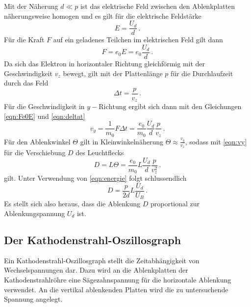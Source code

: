 Mit der Näherung $d \ll p$ ist das elektrische Feld zwischen den Ablenkplatten näherungsweise
homogen und es gilt für die elektrische Feldstärke
\begin{equation}
  E = \frac{U_d}{d}\,.
  \label{eqn:EUd}
\end{equation}
Für die Kraft $F$ auf ein geladenes Teilchen im elektrischen Feld gilt dann
\begin{equation}
  F = e_0 E = e_0 \frac{U_d}{d}\,.
  \label{eqn:Fe0E}
\end{equation}
Da sich das Elektron in horizontaler Richtung gleichförmig mit der Geschwindigkeit
$v_z$ bewegt, gilt mit der Plattenlänge $p$ für die Durchlaufzeit durch das Feld
\begin{equation}
  \Delta t = \frac{p}{v_z}\,.
  \label{eqn:deltat}
\end{equation}
Für die Geschwindigkeit in $y-\text{Richtung}$ ergibt sich dann mit den Gleichungen
\eqref{eqn:Fe0E} und \eqref{eqn:deltat}
\begin{equation}
  v_y = \frac{1}{m_0} F \Delta t = \frac{e_0}{m_0}\frac{U_d}{d}\frac{p}{v_z}\,.
  \label{eqn:vy}
\end{equation}
Für den Ablenkwinkel $\Theta$ gilt in Kleinwinkelnäherung $\Theta \approx \frac{v_y}{v_z}$, sodass
mit \eqref{eqn:vy} für die Verschiebung $D$ des Leuchtflecks
\begin{equation}
  D = L \Theta = \frac{e_0}{m_0} L \frac{U_d}{d}\frac{p}{v_z^2}\,.
\end{equation}
gilt. Unter Verwendung von \eqref{eqn:energie} folgt schlussendlich
\begin{equation}
  D = \frac{p}{2d} L \frac{U_d}{U_B}\,.
\end{equation}
Es stellt sich also heraus, dass die Ablenkung $D$ proportional zur Ablenkungspannung
$U_d$ ist.
\subsection{Der Kathodenstrahl-Oszillosgraph}
\label{subsec:oszi}
Ein Kathodenstrahl-Oszillosgraph stellt die Zeitabhängigkeit von Wechselspannungen dar.
Dazu wird an die Ablenkplatten der Kathodenstrahlröhre eine Sägezahnspannung für die
horizontale Ablenkung verwendet. An die vertikal ablenkenden Platten wird die zu untersuchende
Spannung angelegt.
